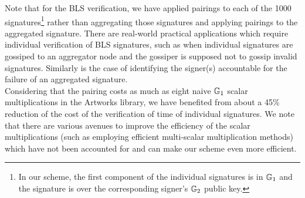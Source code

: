 Note that for the BLS verification, we have applied pairings to each of the 1000 signatures\footnote{In our scheme, the first component of the individual signatures is in $\mathbb{G}_{1}$ and the signature is over the corresponding signer's $\mathbb{G}_{2}$ public key.} rather than aggregating those signatures and applying pairings to the aggregated signature. There are real-world practical applications which require individual verification of BLS signatures, such as when individual signatures are gossiped to an aggregator node and the gossiper is supposed not to gossip invalid signatures. Similarly is the case of identifying the signer(s) accountable for the failure of an aggregated signature.\\

Considering that the pairing costs as much as eight naive $\mathbb{G}_{1}$ scalar multiplications in the Artworks library, we have benefited from about a 45\% reduction of the cost of the verification of time of individual signatures. We note that there are various avenues to improve the efficiency of the scalar multiplications (such as employing efficient multi-scalar multiplication methods) which have not been accounted for and can make our scheme even more efficient.
